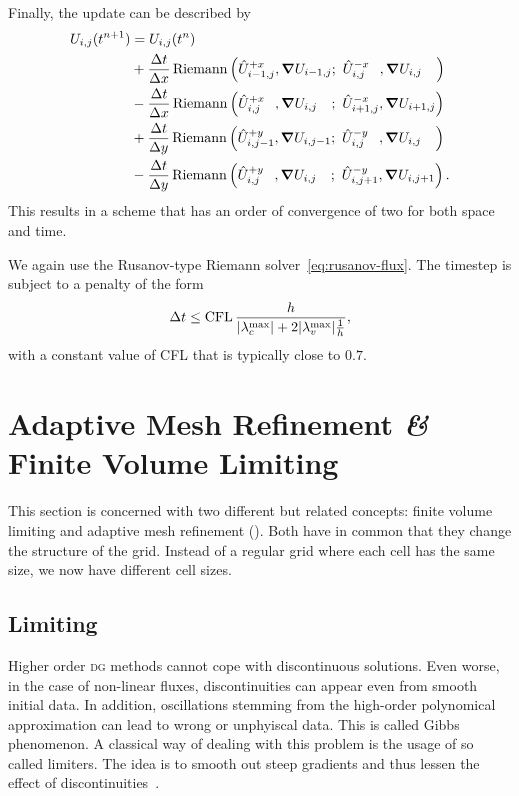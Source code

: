 Finally, the update can be described by
\begin{align}
  \begin{split}
    \cellAvg (t^{n+1}) &= \cellAvg (t^n)
    \\ &+
  \frac{\Delta t}{\Delta x}
    \Riemann \left(
      \evolvedCellAvg[i-1,j]{+x}, \gradCellAvg[i-1,j]; \ %
      \evolvedCellAvg[i,j\phantom{-1}]{-x}, \gradCellAvg[i,j\phantom{-1}]
    \right)
    \\ &-
  \frac{\Delta t}{\Delta x}
    \Riemann \left(
      \evolvedCellAvg[i,j\phantom{+1}]{+x}, \gradCellAvg[i,j\phantom{+1}]; \ %
      \evolvedCellAvg[i+1,j]{-x}, \gradCellAvg[i+1,j]
    \right)
    \\ &+
  \frac{\Delta t}{\Delta y}
    \Riemann \left(
      \evolvedCellAvg[i,j-1]{+y}, \gradCellAvg[i,j-1]; \ %
      \evolvedCellAvg[i,j\phantom{-1}]{-y}, \gradCellAvg[i,j\phantom{-1}]
    \right)
    \\ &-
  \frac{\Delta t}{\Delta y}
    \Riemann \left(
      \evolvedCellAvg[i,j\phantom{+1}]{+y}, \gradCellAvg[i,j\phantom{+1}]; \ %
      \evolvedCellAvg[i,j+1]{-y}, \gradCellAvg[i,j+1]
    \right).
  \end{split}
\end{align}
This results in a scheme that has an order of convergence of two for both space and time.

We again use the Rusanov-type Riemann solver~\cref{eq:rusanov-flux}.
The timestep is subject to a penalty of the form
\begin{equation}\label{eq:cfl-muscl}
 \Delta t \leq  \text{CFL} \, \frac{h}{\maxConvEigen + 2 \maxViscEigen \frac{1}{h}},
\end{equation}
with a constant value of CFL that is typically close to $0.7$.

\section{Adaptive Mesh Refinement \textit{\&} Finite Volume Limiting}\label{sec:grid}
This section is concerned with two different but related concepts:
finite volume limiting and adaptive mesh refinement (\amr{}).
Both have in common that they change the structure of the grid.
Instead of a regular grid where each cell has the same size, we now have different cell sizes.

\subsection{Limiting}\label{sec:limiting}
Higher order \textsc{dg} methods cannot cope with discontinuous solutions.
Even worse, in the case of non-linear fluxes, discontinuities can appear even from smooth initial data.
In addition, oscillations stemming from the high-order polynomical approximation can lead to wrong or unphyiscal data.
This is called Gibbs phenomenon.
A classical way of dealing with this problem is the usage of so called limiters.
The idea is to smooth out steep gradients and thus lessen the effect of discontinuities~\cite{hesthaven2008nodal}.

